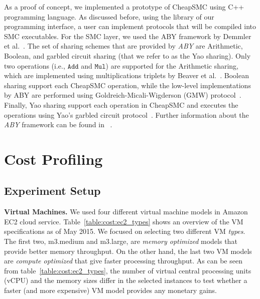 \documentclass{llncs}
\newcommand{\sysname}{{CheapSMC}\xspace}
\begin{document}
As a proof of concept, we implemented a prototype of \sysname using C++ programming language. As discussed before, using the library of  our programming interface, a user can implement protocols that will be compiled into SMC executables. For the SMC layer, we used the ABY framework by Demmler et al.~\cite{cite:demmler2015aby}. The set of sharing schemes that are provided by \emph{ABY} are Arithmetic, Boolean, and garbled circuit sharing (that we refer to as the Yao sharing). Only two operations (i.e., $\mathtt{Add}$ and $\mathtt{Mul}$) are supported for the Arithmetic sharing, which are implemented using multiplications triplets by Beaver et al.~\cite{cite:beaver1992efficient}. Boolean sharing support each \sysname operation, while the low-level implementations by ABY are performed using Goldreich-Micali-Wigderson (GMW) protocol~\cite{cite:goldwasser1987play}. Finally, Yao sharing support each operation in \sysname and executes the operations using Yao's garbled circuit protocol~\cite{cite:yao1982protocols}. Further information about the \emph{ABY} framework can be found in ~\cite{cite:demmler2015aby}.


\vspace{-0.5cm}
\section{Cost Profiling}
\label{sec:cost}

\subsection{Experiment Setup}
\label{sec:cost:setup}

\textbf{Virtual Machines.} We used four different virtual machine models in Amazon EC2 cloud service. Table~\ref{table:cost:ec2_types} shows an overview of the VM specifications as of May 2015. We focused on selecting two different VM \emph{types}. The first two, m3.medium and m3.large, are \emph{memory optimized} models that provide better memory throughput. On the other hand, the last two VM models are \emph{compute optimized} that give faster processing throughput. As can be seen from table~\ref{table:cost:ec2_types}, the number of virtual central processing units (vCPU) and the memory sizes differ in the selected instances to test whether a faster (and more expensive) VM model provides any monetary gains.
\end{document}

